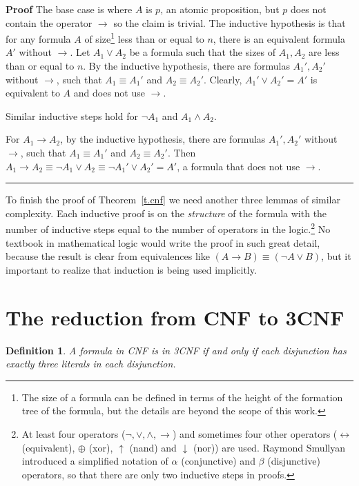 \documentclass[11pt,a4paper]{report}
\newcommand*{\qed}{\hfill\rule{1ex}{1.5ex}}
\newtheorem{definition}[theorem]{Definition}
\begin{document}
\textbf{Proof} The base case is where $A$ is $p$, an atomic proposition, but $p$ does not contain the operator $\rightarrow$ so the claim is trivial. The inductive hypothesis is that for any formula $A$ of size\footnote{The size of a formula can be defined in terms of the height of the formation tree of the formula, but the details are beyond the scope of this work.}
 less than or equal to $n$, there is an equivalent formula $A'$ without $\rightarrow$. Let $A_1 \vee A_2$ be a formula such that the sizes of $A_1, A_2$ are less than or equal to $n$. By the inductive hypothesis, there are formulas $A_1', A_2'$ without $\rightarrow$, such that $A_1\equiv A_1'$ and $A_2\equiv A_2'$. Clearly, $A_1' \vee A_2' = A'$ is equivalent to $A$ and does not use $\rightarrow$.

Similar inductive steps hold for $\neg A_1$ and $A_1 \wedge A_2$.

For $A_1 \rightarrow A_2$, by the inductive hypothesis, there are formulas $A_1', A_2'$ without $\rightarrow$, such that $A_1\equiv A_1'$ and $A_2\equiv A_2'$. Then $A_1 \rightarrow A_2 \equiv \neg A_1 \vee A_2 \equiv \neg A_1' \vee A_2' = A'$, a formula that does not use $\rightarrow$.\qed

To finish the proof of Theorem~\ref{t.cnf} we need another three lemmas of similar complexity. Each inductive proof is on the \emph{structure} of the formula with the number of inductive steps equal to the number of operators in the logic.\footnote{At least four operators ($\neg,\vee,\wedge,\rightarrow$) and sometimes four other operators ($\leftrightarrow$ (equivalent), $\oplus$ (xor), $\uparrow$ (nand) and $\downarrow$ (nor)) are used. Raymond Smullyan introduced a simplified notation of $\alpha$ (conjunctive) and $\beta$ (disjunctive) operators, so that there are only two inductive steps in proofs.} No textbook in mathematical logic would write the proof in such great detail, because the result is clear from equivalences like $(A\rightarrow B)\equiv(\neg A \vee B)$, but it important to realize that induction is being used implicitly.

\section{The reduction from CNF to 3CNF}

\begin{definition}
A formula in CNF is in \emph{3CNF} if and only if each disjunction has exactly three literals in each disjunction.
\end{definition}
\end{document}
